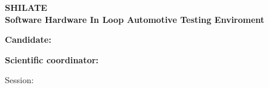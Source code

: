 \begin{titlepage}
\thispagestyle{titlepagestyle}
    \begin{center}
        \vspace*{\fill}
        \textbf{\fontsize{20pt}{30pt} \selectfont SHILATE} \\[12pt]
        \textbf{\fontsize{20pt}{30pt} \selectfont Software Hardware In Loop Automotive Testing Enviroment}
    \end{center}
    
    \vspace*{\fill}
     
            
    \textbf{\fontsize{14pt}{16pt} \selectfont Candidate: \candidateName}
    
    \vspace{14pt}
    
    \textbf{\fontsize{14pt}{16pt} \selectfont Scientific coordinator: \coordinator}

    \begin{center}
        \vspace{50pt}
        \fontsize{14pt}{16pt} \selectfont Session: \monthOfPresentation{} \academicYear 
    \end{center}
    

\end{titlepage}